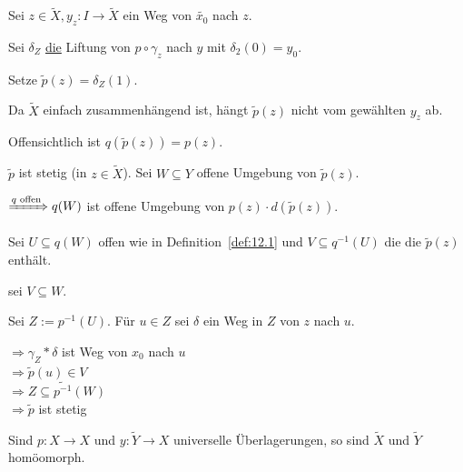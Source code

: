 \begin{beweis}
    Sei $z \in \tilde{X}, y_z: I \rightarrow \tilde{X}$ ein Weg von
    $\tilde{x_0}$ nach $z$.

    Sei $\delta_Z$ \underline{die} Liftung von $p \circ \gamma_z$
    nach $y$ mit $\delta_2(0) = y_0$.

    Setze $\tilde{p}(z) = \delta_Z(1)$.

    Da $\tilde{X}$ einfach zusammenhängend ist, hängt $\tilde{p}(z)$
    nicht vom gewählten $y_z$ ab.

    Offensichtlich ist $q(\tilde{p}(z)) = p(z)$.

    $\tilde{p}$ ist stetig (in $z \in \tilde{X}$). Sei $W \subseteq Y$
    offene Umgebung von $\tilde{p}(z)$.

    $\xRightarrow{q \text{ offen}} q(W)$ ist offene Umgebung von $p(z) \cdot d(\tilde{p}(z))$.

    Sei $U \subseteq q(W)$ offen wie in Definition~\ref{def:12.1} und
    $V \subseteq q^{-1}(U)$ die  die $\tilde{p}(z)$
    enthält.

    \Obda sei $V \subseteq W$.

    Sei $Z := p^{-1}(U)$. Für $u \in Z$ sei $\delta$ ein Weg in $Z$
    von $z$ nach $u$.

    $\Rightarrow \gamma_Z * \delta$ ist Weg von $x_0$ nach $u$\\
    $\Rightarrow \tilde{p}(u) \in V$\\
    $\Rightarrow Z \subseteq \tilde{p^{-1}}(W)$\\
    $\Rightarrow \tilde{p}$ ist stetig
\end{beweis}

\begin{korollar}%
    Sind $p:X \rightarrow X$ und $y: \tilde{Y} \rightarrow X$
    universelle Überlagerungen, so sind $\tilde{X}$ und $\tilde{Y}$
    homöomorph.
\end{korollar}

